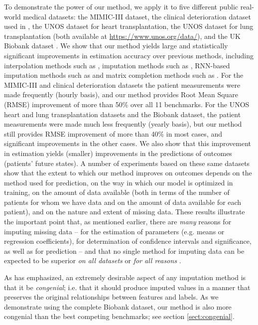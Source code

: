 \documentclass{article}
\begin{document}
	To demonstrate the power of our method, we apply it to five different public real-world medical datasets: the MIMIC-III \cite{MIMIC} dataset, the clinical deterioration dataset used in \cite{TBME},  the UNOS  dataset for heart transplantation,  the UNOS dataset for lung transplantation (both available at  \underline{https://www.unos.org/data/}), and the UK Biobank dataset \cite{Biobank}.  We show that our method yields large and statistically significant improvements in estimation accuracy over previous methods, including  interpolation methods such as \cite{interpolation,wavelet}, imputation methods such as \cite{Rubin,EM,MICE,missforest}, RNN-based imputation methods such as \cite{Recent_RNN1,Recent_RNN2,Recent_RNN3} and matrix completion methods such as \cite{Mat-0}. For the MIMIC-III and clinical deterioration datasets the patient measurements were made frequently (hourly basis), and our method provides Root Mean Square (RMSE) improvement of more than 50\% over all 11 benchmarks.  For the UNOS heart and lung transplantation datasets and the Biobank dataset, the patient measurements were made much less frequently (yearly basis), but our method still provides RMSE improvement of more than 40\% in most cases, and significant improvements in the other cases.  We also show that this improvement in estimation  yields (smaller) improvements in the predictions of outcomes (patients' future states).  A number of experiments based on these same datasets show that the extent to which our method improves on outcomes depends on the method used for prediction, on the way in which our model is optimized in training, on the amount of data available (both in terms of the number of patients for whom we have data and on the amount of data available for each patient), and on the nature and extent of missing data.  These results illustrate the important point that, as mentioned earlier, there are {\em many} reasons for imputing missing data \cite{reason_of_imputation1,reason_of_imputation2} -- for the estimation of parameters (e.g. means or regression coefficients), for determination of confidence intervals and significance, as well as for prediction -- and that no single method for imputing data can be expected to be  superior {\em on all datasets} or {\em for all reasons }.
	
	As \cite{congeniality_meng} has emphasized, an extremely desirable aspect of any imputation method is that it be {\em congenial}; i.e. that it should produce imputed values in a manner that preserves the original relationships between features and labels.  As we demonstrate using the complete Biobank dataset, our method is also more congenial than the best competing benchmarks; see section \ref{sect:congenial}.
	
\end{document}
